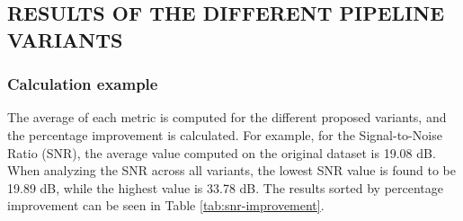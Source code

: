 \subsection{RESULTS OF THE DIFFERENT PIPELINE VARIANTS}

\subsubsection{Calculation example}
The average of each metric is computed for the different proposed variants, and the percentage improvement is calculated. For example, for the Signal-to-Noise Ratio (SNR), the average value computed on the original dataset is 19.08 dB. When analyzing the SNR across all variants, the lowest SNR value is found to be 19.89 dB, while the highest value is 33.78 dB. The results sorted by percentage improvement can be seen in Table \ref{tab:snr-improvement}.


